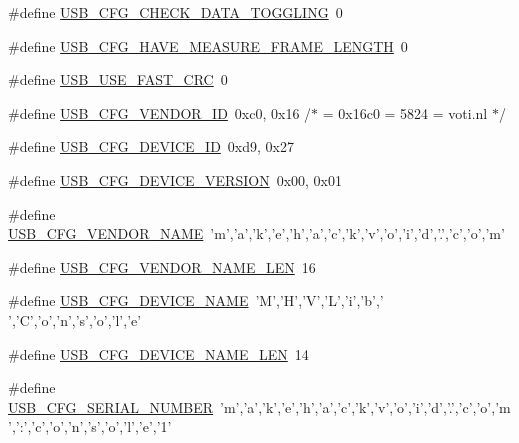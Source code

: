 \begin{DoxyCompactItemize}
\item 
\#define \hyperlink{mhvlib-_vusb-_console_2vusb_2usbconfig_8h_a343f7b4bd7f8ba0348e106ef0f434215}{U\-S\-B\-\_\-\-C\-F\-G\-\_\-\-C\-H\-E\-C\-K\-\_\-\-D\-A\-T\-A\-\_\-\-T\-O\-G\-G\-L\-I\-N\-G}~0
\item 
\#define \hyperlink{mhvlib-_vusb-_console_2vusb_2usbconfig_8h_a64864300fd8efb3c8d636b5c52f46fe7}{U\-S\-B\-\_\-\-C\-F\-G\-\_\-\-H\-A\-V\-E\-\_\-\-M\-E\-A\-S\-U\-R\-E\-\_\-\-F\-R\-A\-M\-E\-\_\-\-L\-E\-N\-G\-T\-H}~0
\item 
\#define \hyperlink{mhvlib-_vusb-_console_2vusb_2usbconfig_8h_a056ce5afad0b0620c90bab5bd81e4166}{U\-S\-B\-\_\-\-U\-S\-E\-\_\-\-F\-A\-S\-T\-\_\-\-C\-R\-C}~0
\item 
\#define \hyperlink{mhvlib-_vusb-_console_2vusb_2usbconfig_8h_a9326b8ec9f809ce66d54349691646930}{U\-S\-B\-\_\-\-C\-F\-G\-\_\-\-V\-E\-N\-D\-O\-R\-\_\-\-I\-D}~0xc0, 0x16 /$\ast$ = 0x16c0 = 5824 = voti.\-nl $\ast$/
\item 
\#define \hyperlink{mhvlib-_vusb-_console_2vusb_2usbconfig_8h_abc740455309399430b0f49bf7931d1d7}{U\-S\-B\-\_\-\-C\-F\-G\-\_\-\-D\-E\-V\-I\-C\-E\-\_\-\-I\-D}~0xd9, 0x27
\item 
\#define \hyperlink{mhvlib-_vusb-_console_2vusb_2usbconfig_8h_aba3c7c0cd4055ba3bbf5df38e57b6d27}{U\-S\-B\-\_\-\-C\-F\-G\-\_\-\-D\-E\-V\-I\-C\-E\-\_\-\-V\-E\-R\-S\-I\-O\-N}~0x00, 0x01
\item 
\#define \hyperlink{mhvlib-_vusb-_console_2vusb_2usbconfig_8h_a25a2baf5c8feb0982a47050423add0ec}{U\-S\-B\-\_\-\-C\-F\-G\-\_\-\-V\-E\-N\-D\-O\-R\-\_\-\-N\-A\-M\-E}~'m','a','k','e','h','a','c','k','v','o','i','d','.','c','o','m'
\item 
\#define \hyperlink{mhvlib-_vusb-_console_2vusb_2usbconfig_8h_a3085d820d9dc6e939737a3f1b9a457d7}{U\-S\-B\-\_\-\-C\-F\-G\-\_\-\-V\-E\-N\-D\-O\-R\-\_\-\-N\-A\-M\-E\-\_\-\-L\-E\-N}~16
\item 
\#define \hyperlink{mhvlib-_vusb-_console_2vusb_2usbconfig_8h_a9b482a2b2740652ffe7dcb6695ca0c91}{U\-S\-B\-\_\-\-C\-F\-G\-\_\-\-D\-E\-V\-I\-C\-E\-\_\-\-N\-A\-M\-E}~'M','H','V','L','i','b',' ','C','o','n','s','o','l','e'
\item 
\#define \hyperlink{mhvlib-_vusb-_console_2vusb_2usbconfig_8h_ae68f17e6baf13805abc56e74beadeb57}{U\-S\-B\-\_\-\-C\-F\-G\-\_\-\-D\-E\-V\-I\-C\-E\-\_\-\-N\-A\-M\-E\-\_\-\-L\-E\-N}~14
\item 
\#define \hyperlink{mhvlib-_vusb-_console_2vusb_2usbconfig_8h_a854f9931a43692546ac669ad8b7c4a98}{U\-S\-B\-\_\-\-C\-F\-G\-\_\-\-S\-E\-R\-I\-A\-L\-\_\-\-N\-U\-M\-B\-E\-R}~'m','a','k','e','h','a','c','k','v','o','i','d','.','c','o','m','\-:','c','o','n','s','o','l','e','1'

\end{DoxyCompactItemize}
